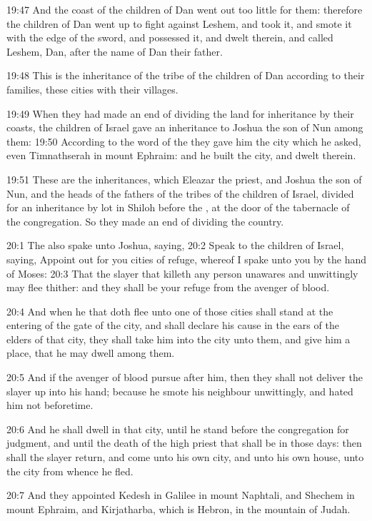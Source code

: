19:47 And the coast of the children of Dan went out too little for them: therefore the children of Dan went up to fight against Leshem, and took it, and smote it with the edge of the sword, and possessed it, and dwelt therein, and called Leshem, Dan, after the name of Dan their father.

19:48 This is the inheritance of the tribe of the children of Dan according to their families, these cities with their villages.

19:49 When they had made an end of dividing the land for inheritance by their coasts, the children of Israel gave an inheritance to Joshua the son of Nun among them: 19:50 According to the word of the \LORD they gave him the city which he asked, even Timnathserah in mount Ephraim: and he built the city, and dwelt therein.

19:51 These are the inheritances, which Eleazar the priest, and Joshua the son of Nun, and the heads of the fathers of the tribes of the children of Israel, divided for an inheritance by lot in Shiloh before the \LORD, at the door of the tabernacle of the congregation. So they made an end of dividing the country.

20:1 The \LORD also spake unto Joshua, saying, 20:2 Speak to the children of Israel, saying, Appoint out for you cities of refuge, whereof I spake unto you by the hand of Moses: 20:3 That the slayer that killeth any person unawares and unwittingly may flee thither: and they shall be your refuge from the avenger of blood.

20:4 And when he that doth flee unto one of those cities shall stand at the entering of the gate of the city, and shall declare his cause in the ears of the elders of that city, they shall take him into the city unto them, and give him a place, that he may dwell among them.

20:5 And if the avenger of blood pursue after him, then they shall not deliver the slayer up into his hand; because he smote his neighbour unwittingly, and hated him not beforetime.

20:6 And he shall dwell in that city, until he stand before the congregation for judgment, and until the death of the high priest that shall be in those days: then shall the slayer return, and come unto his own city, and unto his own house, unto the city from whence he fled.

20:7 And they appointed Kedesh in Galilee in mount Naphtali, and Shechem in mount Ephraim, and Kirjatharba, which is Hebron, in the mountain of Judah.

